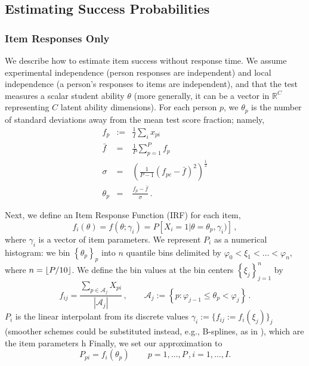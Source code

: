 \documentclass{article}
\DeclarePairedDelimiter\floor{\lfloor}{\rfloor}
\newcommand{\cA}{\mathcal{A}}
\newcommand{\ta}{\theta}
\newcommand{\R}{\mathbb{R}}
\begin{document}
\subsection{Estimating Success Probabilities}
\label{ability_estimation}

\subsubsection{Item Responses Only}
We describe how to estimate item success without response time. We assume experimental independence (person responses are independent) and local independence (a person's responses to items are independent), and that the test measures a scalar student ability $\theta$ (more generally, it can be a vector in $\R^C$ representing $C$ latent ability dimensions). For each person $p$, we $\theta_p$ is the number of standard deviations away from the mean test score fraction; namely,
\begin{eqnarray}
	f_{p} &:=& \frac{1}{I} \sum_i x_{pi} \\
	\bar{f} &=& \frac{1}{P} \sum_{p=1}^{P} f_{p} \\
	\sigma &=& \left(\frac{1}{P-1} (f_{pc} - \bar{f})^2 \right)^{\frac12} \\
	\theta_{p} &=& \frac{f_{p} - \bar{f}}{\sigma}\,.
	\label{theta_init}
\end{eqnarray}

Next, we define an Item Response Function (IRF) for each item,
\begin{equation}
  f_i(\theta) = f(\theta; \gamma_i) = P \left[X_i=1 | \theta=\theta_p, \gamma_i) \right]\,,
\end{equation}
where $\gamma_i$ is a vector of item parameters. We represent $P_i$ as a numerical histogram: we bin $\left\{\theta_p\right\}_p$ into $n$ quantile bins delimited by $\varphi_0 < \xi_1 < \dots < \varphi_n$, where $n = \floor*{P / 10}$. We define the bin values at the bin centers $\left\{\xi_j \right\}_{j=1}^n$ by
\begin{equation}
	\label{histogram_const}
	f_{ij} = \frac{\sum_{p \in \cA_j} X_{pi}}{|\cA_j|}\,,\qquad
	\cA_j := \left\{ p : \varphi_{j-1} \leq \ta_p < \varphi_j \right\}\,.
\end{equation}
$P_i$ is the linear interpolant from its discrete values $\gamma_i := \{f_{ij} := f_i(\xi_j)\}_j$ (smoother schemes could be substituted instead, e.g., B-splines, as in \cite{matt_bsplines}), which are the item parameters h Finally, we set our approximation to
\begin{equation}
	P_{pi} = f_i(\theta_p)\qquad\, p=1,\dots,P\,,i=1,\dots,I.
	\label{ppi_interpolation}
\end{equation}
\end{document}

